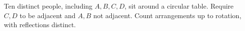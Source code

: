 Ten distinct people, including $A,B,C,D$, sit around a circular table. Require $C,D$ to be adjacent and $A,B$ not adjacent. Count arrangements up to rotation, with reflections distinct.
